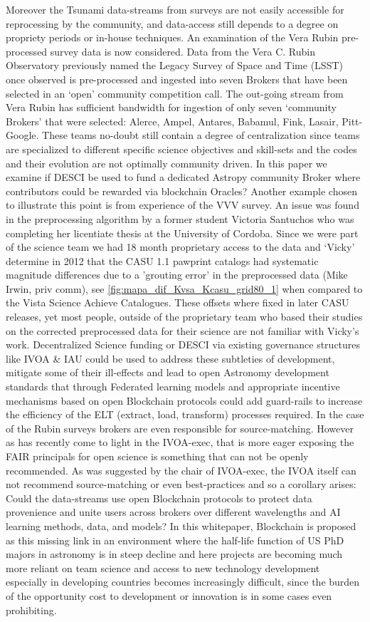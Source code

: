 \documentclass[final,5p,times,twocolumn,authoryear]{elsarticle}
\begin{document}
Moreover the Tsunami data-streams from surveys are not easily accessible for reprocessing by the community, and data-access still depends to a degree on propriety periods or in-house techniques. An examination of the Vera Rubin pre-processed survey data is now considered. Data from the Vera C. Rubin Observatory previously named the Legacy Survey of Space and Time (LSST) once observed is pre-processed and ingested into seven Brokers that have been selected in an `open' community competition call.  The out-going stream from Vera Rubin has sufficient bandwidth for ingestion of only seven `community Brokers' that were selected: Alerce, Ampel, Antares, Babamul, Fink, Lasair, Pitt-Google. These teams no-doubt still contain a degree of centralization since teams are specialized to different specific science objectives and skill-sets and the codes and their evolution are not optimally community driven. In this paper we examine if DESCI be used to fund a dedicated Astropy community Broker where contributors could be rewarded via blockchain Oracles? Another example chosen to illustrate this point is from experience of the VVV survey. An issue was found in the preprocessing algorithm by a former student Victoria Santuchos who was completing her licentiate thesis at the University of Cordoba. Since we were part of the science team we had 18 month proprietary access to the data and `Vicky' determine in 2012 that the CASU 1.1 pawprint catalogs had systematic magnitude differences due to a 'grouting error' in the preprocessed data (Mike Irwin, priv comm), see \ref{fig:mapa_dif_Kvsa_Kcasu_grid80_1} when compared to the Vista Science Achieve Catalogues. These offsets where fixed in later CASU releases, yet most people, outside of the proprietary team who based their studies on the corrected preprocessed data for their science are not familiar with Vicky's work. Decentralized Science funding or DESCI via existing governance structures like IVOA \& IAU could be used to address these subtleties of development, mitigate some of their ill-effects and lead to open Astronomy development standards that through Federated learning models and appropriate incentive mechanisms based on open Blockchain protocols could add guard-rails to increase the efficiency of the  ELT (extract, load, transform) processes required. In the case of the Rubin surveys brokers are even responsible for source-matching. However as has recently come to light in the IVOA-exec, that is more eager exposing the FAIR principals for open science is something that can not be openly recommended. As was suggested by the chair of IVOA-exec, the IVOA itself can not recommend source-matching or even best-practices and so a corollary arises: Could the data-streams use open Blockchain protocols to protect data provenience and unite users across brokers over different wavelengths and AI learning methods, data, and models? In this whitepaper, Blockchain is proposed as this missing link in an environment where the half-life function of US PhD majors in astronomy is in steep decline and here projects are becoming much more reliant on team science and access to new technology development especially in developing countries becomes increasingly difficult, since the burden of the opportunity cost to development or innovation is in some cases even prohibiting.
\end{document}
